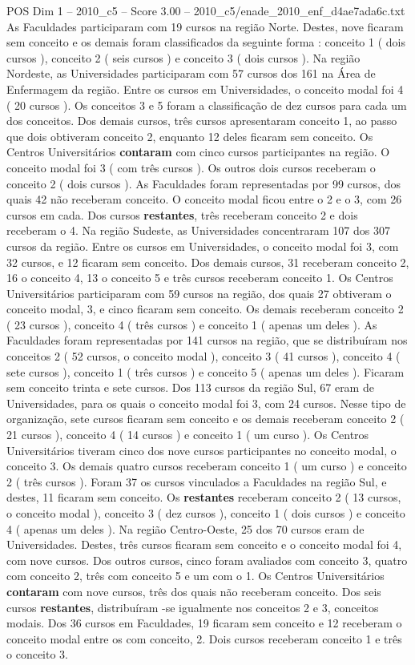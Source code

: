 \begin{textsample}{POS Dim 1 – 2010\_c5 – Score 3.00 – 2010\_c5/enade\_2010\_enf\_d4ae7ada6c.txt}
As Faculdades participaram com 19 cursos na região Norte.
Destes, nove ficaram sem conceito e os demais foram classificados da seguinte forma : conceito 1 ( dois cursos ), conceito 2 ( seis cursos ) e conceito 3 ( dois cursos ).
Na região Nordeste, as Universidades participaram com 57 cursos dos 161 na Área de Enfermagem da região.
Entre os cursos em Universidades, o conceito modal foi 4 ( 20 cursos ).
Os conceitos 3 e 5 foram a classificação de dez cursos para cada um dos conceitos.
Dos demais cursos, três cursos apresentaram conceito 1, ao passo que dois obtiveram conceito 2, enquanto 12 deles ficaram sem conceito.
Os Centros Universitários \textbf{contaram} com cinco cursos participantes na região.
O conceito modal foi 3 ( com três cursos ).
Os outros dois cursos receberam o conceito 2 ( dois cursos ).
As Faculdades foram representadas por 99 cursos, dos quais 42 não receberam conceito.
O conceito modal ficou entre o 2 e o 3, com 26 cursos em cada.
Dos cursos \textbf{restantes}, três receberam conceito 2 e dois receberam o 4.
Na região Sudeste, as Universidades concentraram 107 dos 307 cursos da região.
Entre os cursos em Universidades, o conceito modal foi 3, com 32 cursos, e 12 ficaram sem conceito.
Dos demais cursos, 31 receberam conceito 2, 16 o conceito 4, 13 o conceito 5 e três cursos receberam conceito 1.
Os Centros Universitários participaram com 59 cursos na região, dos quais 27 obtiveram o conceito modal, 3, e cinco ficaram sem conceito.
Os demais receberam conceito 2 ( 23 cursos ), conceito 4 ( três cursos ) e conceito 1 ( apenas um deles ).
As Faculdades foram representadas por 141 cursos na região, que se distribuíram nos conceitos 2 ( 52 cursos, o conceito modal ), conceito 3 ( 41 cursos ), conceito 4 ( sete cursos ), conceito 1 ( três cursos ) e conceito 5 ( apenas um deles ).
Ficaram sem conceito trinta e sete cursos.
Dos 113 cursos da região Sul, 67 eram de Universidades, para os quais o conceito modal foi 3, com 24 cursos.
Nesse tipo de organização, sete cursos ficaram sem conceito e os demais receberam conceito 2 ( 21 cursos ), conceito 4 ( 14 cursos ) e conceito 1 ( um curso ).
Os Centros Universitários tiveram cinco dos nove cursos participantes no conceito modal, o conceito 3.
Os demais quatro cursos receberam conceito 1 ( um curso ) e conceito 2 ( três cursos ).
Foram 37 os cursos vinculados a Faculdades na região Sul, e destes, 11 ficaram sem conceito.
Os \textbf{restantes} receberam conceito 2 ( 13 cursos, o conceito modal ), conceito 3 ( dez cursos ), conceito 1 ( dois cursos ) e conceito 4 ( apenas um deles ).
Na região Centro-Oeste, 25 dos 70 cursos eram de Universidades.
Destes, três cursos ficaram sem conceito e o conceito modal foi 4, com nove cursos.
Dos outros cursos, cinco foram avaliados com conceito 3, quatro com conceito 2, três com conceito 5 e um com o 1.
Os Centros Universitários \textbf{contaram} com nove cursos, três dos quais não receberam conceito.
Dos seis cursos \textbf{restantes}, distribuíram -se igualmente nos conceitos 2 e 3, conceitos modais.
Dos 36 cursos em Faculdades, 19 ficaram sem conceito e 12 receberam o conceito modal entre os com conceito, 2.
Dois cursos receberam conceito 1 e três o conceito 3.


\end{textsample}
